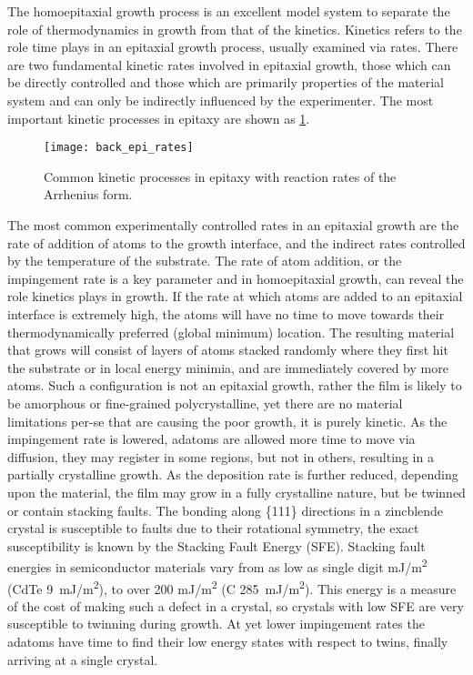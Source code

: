 The homoepitaxial growth process is an excellent model system to separate the role of thermodynamics in growth from that of the kinetics.
Kinetics refers to the role time plays in an epitaxial growth process, usually examined via rates.
There are two fundamental kinetic rates involved in epitaxial growth, those which can be directly controlled and those which are primarily properties of the material system and can only be indirectly influenced by the experimenter. The most important kinetic processes in epitaxy are shown as \cref{fig:back_epi_rates}.
\begin{figure}
 \centering \texttt{[image: back\_epi\_rates]}
 \caption[Kinetic Processes of atoms on surfaces]{\label{fig:back_epi_rates}Common kinetic processes in epitaxy with reaction rates of the Arrhenius form.}
\end{figure}

The most common experimentally controlled rates in an epitaxial growth are the rate of addition of atoms to the growth interface, and the indirect rates controlled by the temperature of the substrate.
The rate of atom addition, or the impingement rate is a key parameter and in homoepitaxial growth, can reveal the role kinetics plays in growth.
If the rate at which atoms are added to an epitaxial interface is extremely high, the atoms will have no time to move towards their thermodynamically preferred (global minimum) location.
The resulting material that grows will consist of layers of atoms stacked randomly where they first hit the substrate or in local energy minimia, and are immediately covered by more atoms.
Such a configuration is not an epitaxial growth, rather the film is likely to be amorphous or fine-grained polycrystalline, yet there are no material limitations per-se that are causing the poor growth, it is purely kinetic.
As the impingement rate is lowered, adatoms are allowed more time to move via diffusion, they may register in some regions, but not in others, resulting in a partially crystalline growth.
As the deposition rate is further reduced, depending upon the material, the film may grow in a fully crystalline nature, but be twinned or contain stacking faults.
The bonding along \{111\} directions in a zincblende crystal is susceptible to faults due to their rotational symmetry, the exact susceptibility is known by the Stacking Fault Energy (SFE)\cite{Duffar2010}.
Stacking fault energies in semiconductor materials vary from as low as single digit mJ/m\textsuperscript{2} (CdTe 9~mJ/m\textsuperscript{2}), to over 200 mJ/m\textsuperscript{2} (C 285~mJ/m\textsuperscript{2})\cite{Takeuchi1999}.
This energy is a measure of the cost of making such a defect in a crystal, so crystals with low SFE are very susceptible to twinning during growth.
At yet lower impingement rates the adatoms have time to find their low energy states with respect to twins, finally arriving at a single crystal.

